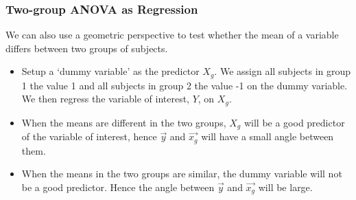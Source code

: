\documentclass{beamer}
\begin{document}
\begin{frame}
  \frametitle{Two-group ANOVA as Regression}

We can also use a geometric perspective to test whether the mean of a variable differs between two groups of subjects.

\begin{itemize}
\item Setup a `dummy variable' as the predictor $X_g$.   We assign all subjects in group 1 the value 1 and all subjects in group 2 the value -1 on the dummy variable.  We then regress the variable of interest, $Y$, on $X_g$.  

\item When the means are different in the two groups, $X_g$ will be a good predictor of the variable of interest, hence $\vec{y}$ and $\vec{x_g}$ will have a small angle between them.

\item When the means in the two groups are similar, the dummy variable will not be a good predictor.  Hence the angle between $\vec{y}$ and $\vec{x_g}$ will be large.

\end{itemize}

\begin{center}


\end{center}

\end{frame}
\end{document}
